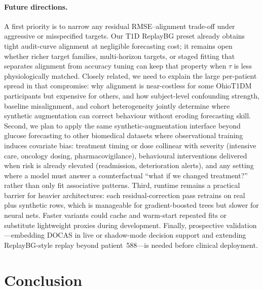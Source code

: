 \documentclass[a4paper,fleqn]{cas-sc}
\begin{document}
\paragraph{Future directions.}
A first priority is to narrow any residual RMSE--alignment trade-off under
aggressive or misspecified targets.
Our T1D ReplayBG preset already obtains tight audit-curve alignment at
negligible forecasting cost; it remains open whether richer target families,
multi-horizon targets, or staged
fitting that separates alignment from accuracy tuning can keep that property
when $\tau$ is less physiologically matched. Closely
related, we need to explain the large per-patient spread in that compromise:
why alignment is near-costless for some OhioT1DM participants but expensive for
others, and how subject-level confounding strength, baseline misalignment, and
cohort heterogeneity jointly determine where synthetic augmentation can correct
behaviour without eroding forecasting skill. Second, we plan to apply the same
synthetic-augmentation interface beyond glucose forecasting to other biomedical
datasets where observational training induces covariate bias: treatment timing or
dose collinear with severity (intensive care, oncology dosing,
pharmacovigilance), behavioural interventions delivered when risk is already
elevated (readmission, deterioration alerts), and any setting where a model must
answer a counterfactual ``what if we changed treatment?'' rather than only fit
associative patterns. Third, runtime remains a practical barrier for heavier
architectures: each residual-correction pass retrains on real plus synthetic
rows, which is manageable for gradient-boosted trees but slower for neural
nets. Faster variants could cache and warm-start repeated fits or substitute
lightweight proxies during development. Finally, prospective
validation---embedding DOCAS in live or shadow-mode decision support and
extending ReplayBG-style replay beyond patient~588---is needed before clinical
deployment.

\section{Conclusion}\label{sec:conclusion}
\end{document}

